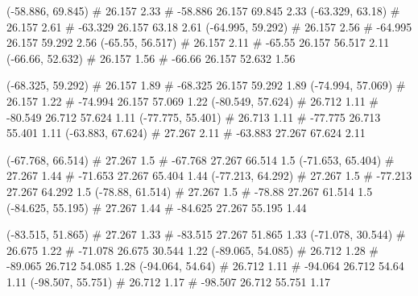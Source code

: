 \documentclass[a4paper,openbib,10pt]{article}
\newenvironment{treegraph}{\begin{graph}}{\end{graph}}
\begin{document}
\begin{treegraph}
  (-58.886, 69.845) #     26.157    2.33
   #    -58.886    26.157    69.845    2.33
  (-63.329, 63.18) #     26.157    2.61
   #    -63.329    26.157    63.18    2.61
  (-64.995, 59.292) #     26.157    2.56
   #    -64.995    26.157    59.292    2.56
  (-65.55, 56.517) #     26.157    2.11
   #    -65.55    26.157    56.517    2.11
  (-66.66, 52.632) #     26.157    1.56
   #    -66.66    26.157    52.632    1.56

  (-68.325, 59.292) #     26.157    1.89
   #    -68.325    26.157    59.292    1.89
  (-74.994, 57.069) #     26.157    1.22
   #    -74.994    26.157    57.069    1.22
  (-80.549, 57.624) #     26.712    1.11
   #    -80.549    26.712    57.624    1.11
  (-77.775, 55.401) #     26.713    1.11
   #    -77.775    26.713    55.401    1.11
  (-63.883, 67.624) #     27.267    2.11
   #    -63.883    27.267    67.624    2.11

  (-67.768, 66.514) #     27.267    1.5
   #    -67.768    27.267    66.514    1.5
  (-71.653, 65.404) #     27.267    1.44
   #    -71.653    27.267    65.404    1.44
  (-77.213, 64.292) #     27.267    1.5
   #    -77.213    27.267    64.292    1.5
  (-78.88, 61.514) #     27.267    1.5
   #    -78.88    27.267    61.514    1.5
  (-84.625, 55.195) #     27.267    1.44
   #    -84.625    27.267    55.195    1.44

  (-83.515, 51.865) #     27.267    1.33
   #    -83.515    27.267    51.865    1.33
  (-71.078, 30.544) #     26.675    1.22
   #    -71.078    26.675    30.544    1.22
  (-89.065, 54.085) #     26.712    1.28
   #    -89.065    26.712    54.085    1.28
  (-94.064, 54.64) #     26.712    1.11
   #    -94.064    26.712    54.64    1.11
  (-98.507, 55.751) #     26.712    1.17
   #    -98.507    26.712    55.751    1.17


\end{treegraph}
\end{document}
